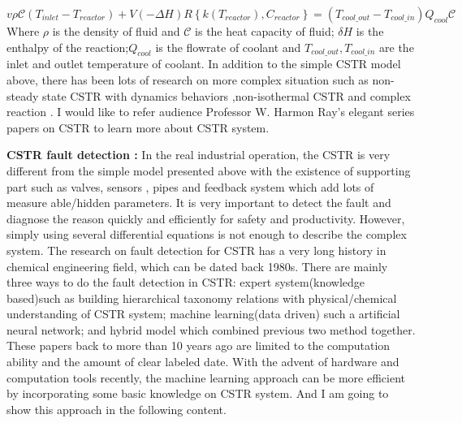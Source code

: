 \documentclass[fleqn,11pt]{wlscirep}
\begin{document}
\begin{equation} 
    v \rho \mathcal{C}(T_{inlet}-T_{reactor})+V(-\Delta H)R\left\{k(T_{reactor}),C_{reactor}\right\}=(T_{cool\_out}-T_{cool\_in})Q_{cool} \mathcal{C}
\end{equation}
Where $\rho$ is the density of fluid and $\mathcal{C}$ is the heat capacity of fluid; $\delta H$ is the enthalpy of the reaction;$Q_{cool}$ is the flowrate of coolant and $T_{cool\_out}, T_{cool\_in}$ are the inlet and outlet temperature of coolant. In addition to the simple CSTR model above, there has been lots of research on more complex situation such as non-steady state CSTR with dynamics behaviors \cite{balakotaiah1981analysis,schmidt1981dynamic} ,non-isothermal CSTR \cite{hamer1981dynamic} and complex reaction \cite{scott1983reversible,lin1981multiplicity}. I would like to refer audience Professor W. Harmon Ray's elegant series papers  on CSTR \cite{teymour1989dynamic,teymour1992dynamic,teymour1992dynamic2}  to learn more about CSTR system. 

\textbf{CSTR fault detection :} In the real industrial operation, the CSTR is very different from the simple model presented above with the existence of supporting part such as valves, sensors , pipes and feedback system which add lots of measure able/hidden parameters. It is very important to detect the fault and diagnose the reason quickly and efficiently for safety and productivity. However, simply using several differential equations is not enough to describe the complex system. The research on fault detection for CSTR has a very long history in chemical engineering field, which can be dated back 1980s. There are mainly three ways to do the fault detection in CSTR: expert system(knowledge based)such as building hierarchical taxonomy relations with physical/chemical understanding  of CSTR system\cite{chang1990line,terpstra1992real}; machine learning(data driven) such a artificial neural network\cite{hoskins1991fault}; and hybrid model which combined previous two method together\cite{ozyurt1996hybrid,zhang1996process}.  These papers back to more than 10 years ago are limited to the computation ability and the amount of clear labeled date. With the advent of hardware and computation tools recently, the machine learning approach can be more efficient by incorporating some basic knowledge on CSTR system. And I am going to show this approach in the following content.
\end{document}
